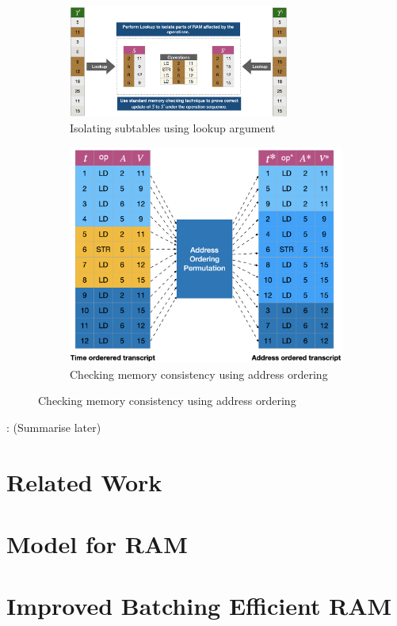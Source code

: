 \documentclass[11pt]{article}
\begin{document}
    \begin{figure}[t]
    \begin{subfigure}{\textwidth}
    \centering
    \includegraphics[width=0.8\textwidth]{example-lookup}
    \caption{Isolating subtables using lookup argument}
    \label{fig:subtable-consistency}
    \end{subfigure}
    \begin{subfigure}{\textwidth}
    \centering
        \includegraphics[height=0.3\textheight]{Address-ordered}
        \caption{Checking memory consistency using address ordering}
        \label{fig:permuted-transcripts}
    \end{subfigure}
    \end{figure}


    : (Summarise later)

    \section{Related Work}\label{sec:rel-work}

    \section{Model for RAM}\label{sec:model-for-ram}
    

    \section{Improved Batching Efficient RAM}\label{sec:batch-efficient-ram}
    




    
    
\end{document}
